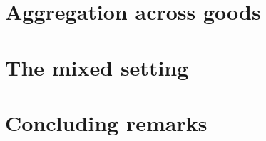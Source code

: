\documentclass[english, a4paper,12pt]{article}
\begin{document}
\section{Aggregation across goods} \label{sec:onegood}

\section{The mixed setting} \label{sec:mixedagg}


\section{Concluding remarks} \label{sec:conclusion}




\end{document}
